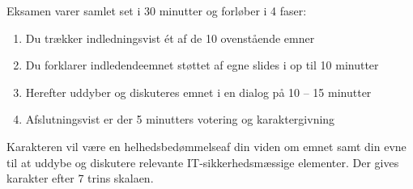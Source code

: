 \documentclass[Screen16to9,17pt]{foils}
\begin{document}

Eksamen varer samlet set i 30 minutter og forløber i 4 faser:

\begin{enumerate}
  \item Du trækker indledningsvist ét af de 10 ovenstående emner
  \item Du forklarer indledendeemnet støttet af egne slides i op til 10 minutter
  \item Herefter uddyber og diskuteres emnet i en dialog på 10 -- 15 minutter
  \item Afslutningsvist er der 5 minutters votering og karaktergivning
\end{enumerate}

Karakteren vil være en helhedsbedømmelseaf din viden om emnet samt din evne til at uddybe og diskutere relevante IT-sikkerhedsmæssige elementer. Der gives karakter efter 7 trins skalaen.
\end{document}

